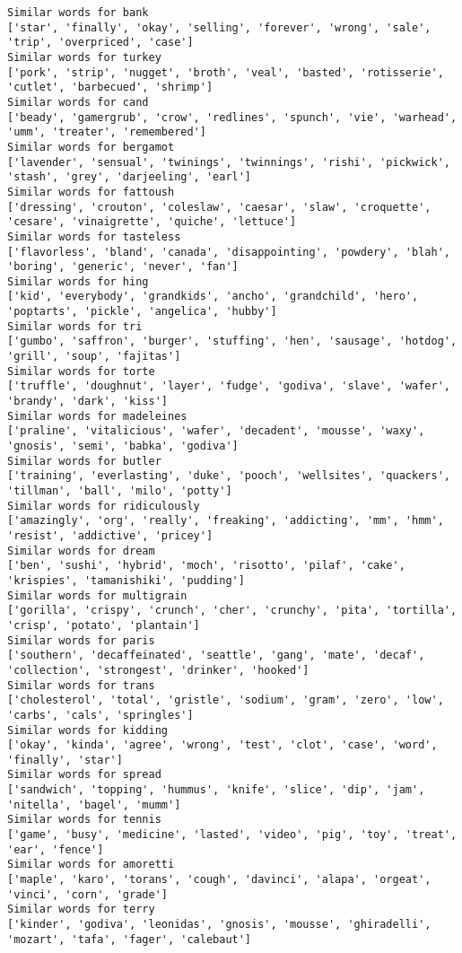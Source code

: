 \documentclass[11pt]{article}
\begin{document}
\begin{Verbatim}[commandchars=\\\{\}]
Similar words for bank
['star', 'finally', 'okay', 'selling', 'forever', 'wrong', 'sale', 'trip', 'overpriced', 'case']
Similar words for turkey
['pork', 'strip', 'nugget', 'broth', 'veal', 'basted', 'rotisserie', 'cutlet', 'barbecued', 'shrimp']
Similar words for cand
['beady', 'gamergrub', 'crow', 'redlines', 'spunch', 'vie', 'warhead', 'umm', 'treater', 'remembered']
Similar words for bergamot
['lavender', 'sensual', 'twinings', 'twinnings', 'rishi', 'pickwick', 'stash', 'grey', 'darjeeling', 'earl']
Similar words for fattoush
['dressing', 'crouton', 'coleslaw', 'caesar', 'slaw', 'croquette', 'cesare', 'vinaigrette', 'quiche', 'lettuce']
Similar words for tasteless
['flavorless', 'bland', 'canada', 'disappointing', 'powdery', 'blah', 'boring', 'generic', 'never', 'fan']
Similar words for hing
['kid', 'everybody', 'grandkids', 'ancho', 'grandchild', 'hero', 'poptarts', 'pickle', 'angelica', 'hubby']
Similar words for tri
['gumbo', 'saffron', 'burger', 'stuffing', 'hen', 'sausage', 'hotdog', 'grill', 'soup', 'fajitas']
Similar words for torte
['truffle', 'doughnut', 'layer', 'fudge', 'godiva', 'slave', 'wafer', 'brandy', 'dark', 'kiss']
Similar words for madeleines
['praline', 'vitalicious', 'wafer', 'decadent', 'mousse', 'waxy', 'gnosis', 'semi', 'babka', 'godiva']
Similar words for butler
['training', 'everlasting', 'duke', 'pooch', 'wellsites', 'quackers', 'tillman', 'ball', 'milo', 'potty']
Similar words for ridiculously
['amazingly', 'org', 'really', 'freaking', 'addicting', 'mm', 'hmm', 'resist', 'addictive', 'pricey']
Similar words for dream
['ben', 'sushi', 'hybrid', 'moch', 'risotto', 'pilaf', 'cake', 'krispies', 'tamanishiki', 'pudding']
Similar words for multigrain
['gorilla', 'crispy', 'crunch', 'cher', 'crunchy', 'pita', 'tortilla', 'crisp', 'potato', 'plantain']
Similar words for paris
['southern', 'decaffeinated', 'seattle', 'gang', 'mate', 'decaf', 'collection', 'strongest', 'drinker', 'hooked']
Similar words for trans
['cholesterol', 'total', 'gristle', 'sodium', 'gram', 'zero', 'low', 'carbs', 'cals', 'springles']
Similar words for kidding
['okay', 'kinda', 'agree', 'wrong', 'test', 'clot', 'case', 'word', 'finally', 'star']
Similar words for spread
['sandwich', 'topping', 'hummus', 'knife', 'slice', 'dip', 'jam', 'nitella', 'bagel', 'mumm']
Similar words for tennis
['game', 'busy', 'medicine', 'lasted', 'video', 'pig', 'toy', 'treat', 'ear', 'fence']
Similar words for amoretti
['maple', 'karo', 'torans', 'cough', 'davinci', 'alapa', 'orgeat', 'vinci', 'corn', 'grade']
Similar words for terry
['kinder', 'godiva', 'leonidas', 'gnosis', 'mousse', 'ghiradelli', 'mozart', 'tafa', 'fager', 'calebaut']

\end{Verbatim}
\end{document}
